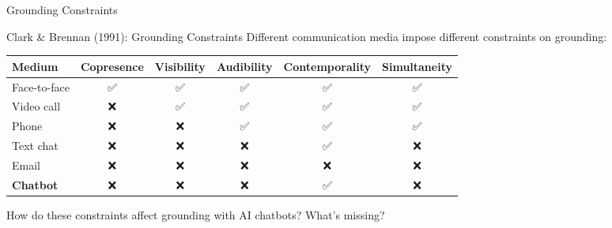 \documentclass[aspectratio=169]{beamer}
\begin{document}
\begin{frame}{Grounding Constraints 🔧}
    \begin{block}{Clark \& Brennan (1991): Grounding Constraints}
        Different communication media impose different constraints on grounding:
    \end{block}

    \vspace{0.3cm}

    \begin{table}
        \small
        \begin{tabular}{lccccc}
            \toprule
            \textbf{Medium} & \textbf{Copresence} & \textbf{Visibility} & \textbf{Audibility} & \textbf{Contemporality} & \textbf{Simultaneity} \\
            \midrule
            Face-to-face & ✅ & ✅ & ✅ & ✅ & ✅ \\
            Video call & ❌ & ✅ & ✅ & ✅ & ✅ \\
            Phone & ❌ & ❌ & ✅ & ✅ & ✅ \\
            Text chat & ❌ & ❌ & ❌ & ✅ & ❌ \\
            Email & ❌ & ❌ & ❌ & ❌ & ❌ \\
            \textbf{Chatbot} & ❌ & ❌ & ❌ & ✅ & ❌ \\
            \bottomrule
        \end{tabular}
    \end{table}

    \vspace{0.3cm}

    \begin{thinkaboutit}
        How do these constraints affect grounding with AI chatbots? What's missing?
    \end{thinkaboutit}
\end{frame}
\end{document}
